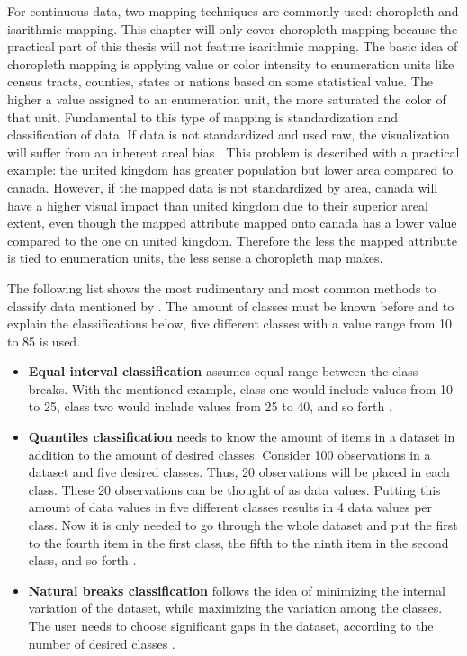 For continuous data, two mapping techniques are commonly used: choropleth and isarithmic mapping. This chapter will only cover choropleth mapping because the practical part of this thesis will not feature isarithmic mapping. The basic idea of choropleth mapping is applying value or color intensity to enumeration units like census tracts, counties, states or nations based on some statistical value. The higher a value assigned to an enumeration unit, the more saturated the color of that unit. Fundamental to this type of mapping is standardization and classification of data. If data is not standardized and used raw, the visualization will suffer from an inherent areal bias . This problem is described with a practical example: the united kingdom has greater population but lower area compared to canada. However, if the mapped data is not standardized by area, canada will have a higher visual impact than united kingdom due to their superior areal extent, even though the mapped attribute mapped onto canada has a lower value compared to the one on united kingdom. Therefore the less the mapped attribute is tied to enumeration units, the less sense a choropleth map makes.

The following list shows the most rudimentary and most common methods to classify data mentioned by \citeauthor{McMaster2010}. The amount of classes must be known before and to explain the classifications below, five different classes with a value range from 10 to 85 is used.

\begin{itemize}

\item \textbf{Equal interval classification} assumes equal range between the class breaks. With the mentioned example, class one would include values from 10 to 25, class two would include values from 25 to 40, and so forth .

\item \textbf{Quantiles classification} needs to know the amount of items in a dataset in addition to the amount of desired classes. Consider 100 observations in a dataset and five desired classes. Thus, 20 observations will be placed in each class. These 20 observations can be thought of as data values. Putting this amount of data values in five different classes results in 4 data values per class. Now it is only needed to go through the whole dataset and put the first to the fourth item in the first class, the fifth to the ninth item in the second class, and so forth .

\item \textbf{Natural breaks classification} follows the idea of minimizing the internal variation of the dataset, while maximizing the variation among the classes. The user needs to choose significant gaps in the dataset, according to the number of desired classes .

\end{itemize}
